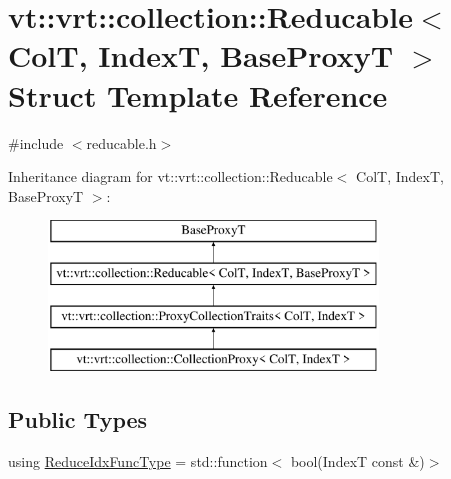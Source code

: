 \hypertarget{structvt_1_1vrt_1_1collection_1_1_reducable}{}\section{vt\+:\+:vrt\+:\+:collection\+:\+:Reducable$<$ ColT, IndexT, Base\+ProxyT $>$ Struct Template Reference}
\label{structvt_1_1vrt_1_1collection_1_1_reducable}


{\ttfamily \#include $<$reducable.\+h$>$}

Inheritance diagram for vt\+:\+:vrt\+:\+:collection\+:\+:Reducable$<$ ColT, IndexT, Base\+ProxyT $>$\+:\begin{figure}[H]
\begin{center}
\leavevmode
\includegraphics[height=4.000000cm]{structvt_1_1vrt_1_1collection_1_1_reducable}
\end{center}
\end{figure}
\subsection*{Public Types}
\begin{DoxyCompactItemize}
\item 
using \hyperlink{structvt_1_1vrt_1_1collection_1_1_reducable_a9f5a6c385efafe1fa52937f4809a9486}{Reduce\+Idx\+Func\+Type} = std\+::function$<$ bool(IndexT const  \&)$>$
\end{DoxyCompactItemize}
